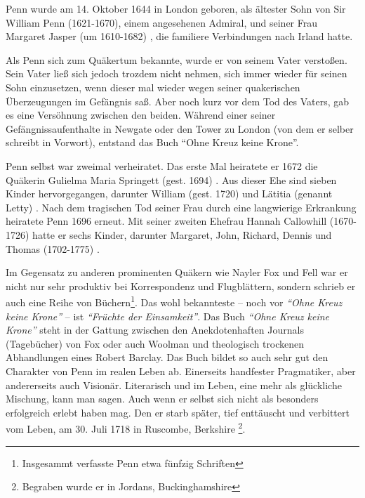 \medskip

Penn wurde am 14. Oktober 1644 in London
 geboren, als ältester Sohn von Sir William Penn
(1621-1670), einem angesehenen Admiral, und
seiner Frau Margaret Jasper (um 1610-1682) ,
die familiere Verbindungen nach Irland  hatte.
\medskip

Als Penn sich zum Quäkertum bekannte, wurde er von seinem Vater verstoßen.
Sein Vater ließ sich jedoch trozdem nicht nehmen, sich immer wieder für seinen
Sohn einzusetzen, wenn dieser mal wieder
wegen seiner quakerischen Überzeugungen im Gefängnis saß. Aber noch
kurz vor dem Tod des Vaters, gab es eine Versöhnung zwischen den beiden. Während
einer seiner Gefängnissaufenthalte in Newgate  oder den Tower zu London (von dem er selber schreibt in Vorwort), entstand
das Buch "`Ohne Kreuz keine Krone"'.

\medskip

Penn selbst war zweimal verheiratet. Das erste Mal heiratete er 1672 die
Quäkerin Gulielma Maria Springett (gest. 1694)
. Aus dieser Ehe sind sieben Kinder
hervorgegangen, darunter William (gest. 1720) und Lätitia (genannt Letty)
. Nach dem tragischen Tod seiner Frau
durch eine langwierige Erkrankung heiratete Penn 1696 erneut. Mit seiner zweiten
Ehefrau Hannah Callowhill (1670-1726)  hatte
er sechs Kinder, darunter Margaret, John, Richard, Dennis und Thomas (1702-1775)
.

\medskip

Im Gegensatz zu anderen prominenten Quäkern wie Nayler  Fox und Fell war er nicht nur sehr produktiv bei Korrespondenz und
Flugblättern, sondern schrieb er auch eine Reihe von
Büchern\footnote{Insgesammt verfasste Penn etwa fünfzig Schriften}.
Das wohl bekannteste -- noch vor \textit{"`Ohne Kreuz keine Krone"'} -- ist
\textit{"`Früchte der Einsamkeit"'}. Das Buch \textit{"`Ohne Kreuz keine
Krone"'} steht in der Gattung zwischen den Anekdotenhaften Journals
(Tagebücher) von Fox
oder auch Woolman und theologisch trockenen
Abhandlungen eines Robert Barclay. Das Buch
bildet so auch sehr gut den Charakter von Penn im realen Leben ab. Einerseits
handfester Pragmatiker, aber andererseits auch Visionär. Literarisch und im Leben,
eine mehr als glückliche Mischung, kann man sagen. Auch wenn er selbst sich
nicht als besonders erfolgreich erlebt haben mag. Den er starb später, tief
enttäuscht und verbittert vom Leben, am 30. Juli 1718 in Ruscombe, Berkshire
\footnote{Begraben wurde er in
Jordans, Buckinghamshire }.

